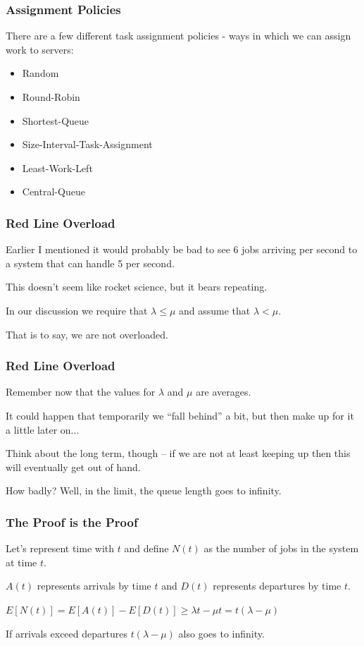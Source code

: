 \begin{frame}
\frametitle{Assignment Policies}

There are a few different task assignment policies - ways in which we can assign work to servers:

\begin{itemize}
	\item Random
	\item Round-Robin
	\item Shortest-Queue
	\item Size-Interval-Task-Assignment
	\item Least-Work-Left
	\item Central-Queue
\end{itemize}

\end{frame}



\begin{frame}
\frametitle{Red Line Overload}

Earlier I mentioned it would probably be bad to see 6 jobs arriving per second to a system that can handle 5 per second. 

This doesn't seem like rocket science, but it bears repeating. 

In our discussion we require that $\lambda \leq \mu$ and assume that $\lambda < \mu$. 

That is to say, we are not overloaded.

\end{frame}



\begin{frame}
\frametitle{Red Line Overload}

Remember now that the values for $\lambda$ and $\mu$ are averages. 

It could happen that temporarily we ``fall behind'' a bit, but then make up for it a little later on... 

Think about the long term, though -- if we are not at least keeping up then this will eventually get out of hand. 

How badly? Well, in the limit, the queue length goes to infinity.

\end{frame}



\begin{frame}
\frametitle{The Proof is the Proof}

Let's represent time with $t$ and define $N(t)$ as the number of jobs in the system at time $t$.

$A(t)$ represents arrivals by time $t$ and $D(t)$ represents departures by time $t$.

\begin{center}
	$E[N(t)] = E[A(t)] - E[D(t)] \geq \lambda t - \mu t = t (\lambda - \mu) $
\end{center}

If arrivals exceed departures  $t (\lambda - \mu) $ also goes to infinity.

\end{frame}



